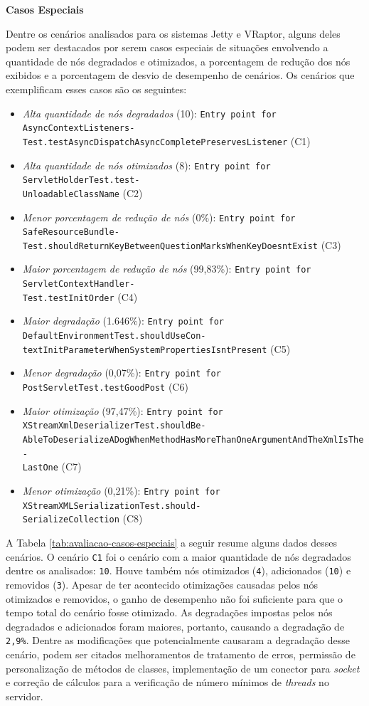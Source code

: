\noindent \textbf{Casos Especiais}

Dentre os cenários analisados para os sistemas Jetty e VRaptor, alguns deles podem ser destacados por serem casos especiais de situações envolvendo a quantidade de nós degradados e otimizados, a porcentagem de redução dos nós exibidos e a porcentagem de desvio de desempenho de cenários. Os cenários que exemplificam esses casos são os seguintes:
\begin{itemize}
  \item \textit{Alta quantidade de nós degradados} (10): \texttt{Entry point for AsyncContextListeners-\\Test.testAsyncDispatchAsyncCompletePreservesListener} (C1)
  \item \textit{Alta quantidade de nós otimizados} (8):  \texttt{Entry point for ServletHolderTest.test-\\UnloadableClassName} (C2)
  \item \textit{Menor porcentagem de redução de nós} (0\%): \texttt{Entry point for SafeResourceBundle-\\Test.shouldReturnKeyBetweenQuestionMarksWhenKeyDoesntExist} (C3)
  \item \textit{Maior porcentagem de redução de nós} (99,83\%): \texttt{Entry point for ServletContextHandler-\\Test.testInitOrder} (C4)
  \item \textit{Maior degradação} (1.646\%): \texttt{Entry point for DefaultEnvironmentTest.shouldUseCon-\\textInitParameterWhenSystemPropertiesIsntPresent} (C5)
  \item \textit{Menor degradação} (0,07\%): \texttt{Entry point for PostServletTest.testGoodPost} (C6)
  \item \textit{Maior otimização} (97,47\%): \texttt{Entry point for XStreamXmlDeserializerTest.shouldBe-\\AbleToDeserializeADogWhenMethodHasMoreThanOneArgumentAndTheXmlIsThe-\\LastOne} (C7)
  \item \textit{Menor otimização} (0,21\%): \texttt{Entry point for XStreamXMLSerializationTest.should-\\SerializeCollection} (C8)
\end{itemize}

A Tabela \ref{tab:avaliacao-casos-especiais} a seguir resume alguns dados desses cenários. O cenário \texttt{C1} foi o cenário com a maior quantidade de nós degradados dentre os analisados: \texttt{10}. Houve também nós otimizados (\texttt{4}), adicionados (\texttt{10}) e removidos (\texttt{3}). Apesar de ter acontecido otimizações causadas pelos nós otimizados e removidos, o ganho de desempenho não foi suficiente para que o tempo total do cenário fosse otimizado. As degradações impostas pelos nós degradados e adicionados foram maiores, portanto, causando a degradação de \texttt{2,9\%}. Dentre as modificações que potencialmente causaram a degradação desse cenário, podem ser citados melhoramentos de tratamento de erros, permissão de personalização de métodos de classes, implementação de um conector para \textit{socket} e correção de cálculos para a verificação de número mínimos de \textit{threads} no servidor.

